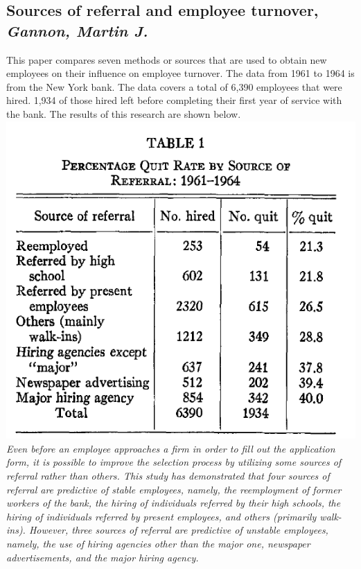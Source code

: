 \documentclass[a4paper, 11pt]{article} %
\begin{document}
\subsection*{Sources of referral and employee turnover, \emph{Gannon, Martin J.} \cite{seventh}}
This paper compares seven methods or sources that are used to obtain new employees on their influence on employee turnover. The data from 1961 to 1964 is from the New York bank. The data covers a total of 6,390 employees that were hired. 1,934 of those hired left before completing their first year of service with the bank. The results of this research are shown below.\\
\includegraphics[width=\textwidth]{table1} \\

\emph{Even before an employee approaches a firm
in order to fill out the application form, it is
possible to improve the selection process by
utilizing some sources of referral rather than
others. This study has demonstrated that four
sources of referral are predictive of stable employees,
namely, the reemployment of former
workers of the bank, the hiring of individuals
referred by their high schools, the hiring of
individuals referred by present employees, and
others (primarily walk-ins). However, three
sources of referral are predictive of unstable
employees, namely, the use of hiring agencies
other than the major one, newspaper advertisements,
and the major hiring agency.} \\
\end{document}
